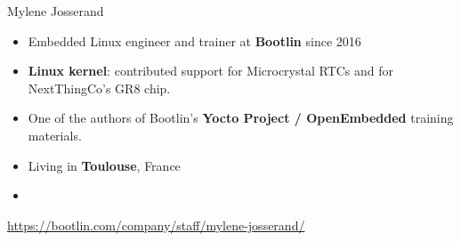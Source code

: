 \begin{frame}{Mylene Josserand}
    \begin{itemize}
	\item Embedded Linux engineer and trainer at {\bf Bootlin}
              since 2016
	\item {\bf Linux kernel}: contributed support for Microcrystal RTCs
	      and for NextThingCo's GR8 chip.
	\item One of the authors of Bootlin's {\bf Yocto Project / OpenEmbedded}
	      training materials.
	\item Living in {\bf Toulouse}, France
	\item {}
    \end{itemize}
    {\small \url{https://bootlin.com/company/staff/mylene-josserand/}}
\end{frame}
